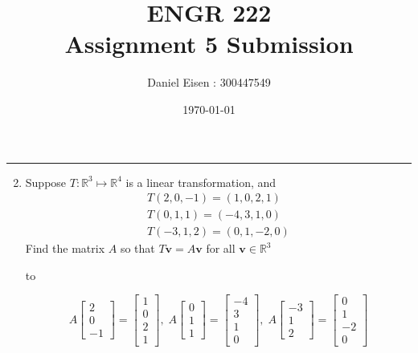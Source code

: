 \documentclass[11pt]{article}
\title{ENGR 222 \\ Assignment 5 Submission}
\author{Daniel Eisen : 300447549}
\date{\today}
\newcommand{\hdotrule}[1]{\hbox to \textwidth{\leaders\hbox to #1pt{\hss . \hss}\hfil}}
\begin{document}
\begin{preview}

      \maketitle
      \hrule
      \begin{enumerate}
            \setcounter{enumi}{1}
            \item Suppose $T : \mathbb{R}^3 \mapsto \mathbb{R}^4$ is a linear transformation, and
            \begin{align*}
                  T(2,0,-1) = (1,0,2,1)\\
                  T(0,1,1) = (-4,3,1,0)\\
                  T(-3,1,2) = (0,1,-2,0)
            \end{align*}
            Find the matrix $A$ so that $T\textbf{v}=A\textbf{v}$ for all $\textbf{v} \in \mathbb{R}^3$
            
            \hdotrule{5}

            $$
                  A \begin{bmatrix}2\\0\\-1\end{bmatrix} = \begin{bmatrix}1\\0\\2\\1\end{bmatrix}, \;
                  A \begin{bmatrix}0\\1\\1\end{bmatrix} = \begin{bmatrix}-4\\3\\1\\0\end{bmatrix}, \;
                  A \begin{bmatrix}-3\\1\\2\end{bmatrix} = \begin{bmatrix}0\\1\\-2\\0\end{bmatrix}
            $$
                  

\end{enumerate}
\end{preview}
\end{document}
